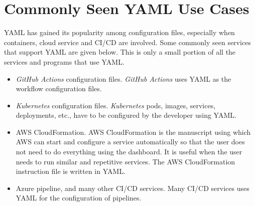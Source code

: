 \section{Commonly Seen YAML Use Cases}

YAML has gained its popularity among configuration files, especially when containers, cloud service and CI/CD are involved. Some commonly seen services that support YAML are given below. This is only a small portion of all the services and programs that use YAML.

\begin{itemize}
	\item \textit{GitHub Actions} configuration files. \textit{GitHub Actions} uses YAML as the workflow configuration files.
	\item \textit{Kubernetes} configuration files. \textit{Kubernetes} pods, images, services, deployments, etc., have to be configured by the developer using YAML.
	\item AWS CloudFormation. AWS CloudFormation is the manuscript using which AWS can start and configure a service automatically so that the user does not need to do everything using the dashboard. It is useful when the user needs to run similar and repetitive services. The AWS CloudFormation instruction file is written in YAML.
	\item Azure pipeline, and many other CI/CD services. Many CI/CD services uses YAML for the configuration of pipelines.
\end{itemize} 